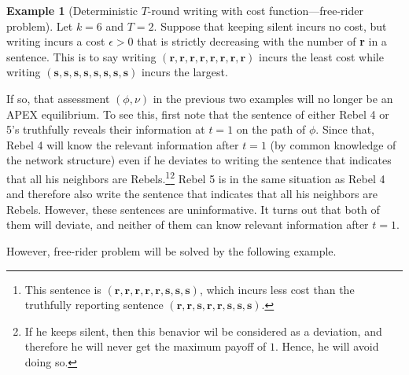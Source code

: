 \documentclass[12pt,letter]{article}
\theoremstyle{definition}
\newtheorem{example}{Example}
\theoremstyle{remark}
\theoremstyle{claim}
\begin{document}
\begin{example}[Deterministic $T$-round writing with cost function---free-rider problem]
\label{ex:cost_function_talk_fr}
Let $k=6$ and $T=2$. Suppose that keeping silent incurs no cost, but writing incurs a cost $\epsilon>0$ that is strictly decreasing with the number of \textbf{r} in a sentence. This is to say writing $(\textbf{r},\textbf{r},\textbf{r},\textbf{r},\textbf{r},\textbf{r},\textbf{r},\textbf{r})$ incurs the least cost while writing $(\textbf{s},\textbf{s},\textbf{s},\textbf{s},\textbf{s},\textbf{s},\textbf{s},\textbf{s})$ incurs the largest. 

If so, that assessment $(\phi, \nu)$ in the previous two examples will no longer be an APEX equilibrium. To see this, first note that the sentence of either Rebel 4 or 5's truthfully reveals their information at $t=1$ on the path of $\phi$. Since that, Rebel 4 will know the relevant information after $t=1$ (by common knowledge of the network structure) even if he deviates to writing the sentence that indicates that all his neighbors are Rebels.\footnote{This sentence is $(\textbf{r},\textbf{r},\textbf{r},\textbf{r},\textbf{r},\textbf{s},\textbf{s},\textbf{s})$, which incurs less cost than the truthfully reporting sentence $(\textbf{r},\textbf{r},\textbf{s},\textbf{r},\textbf{r},\textbf{s},\textbf{s},\textbf{s})$.}\footnote{If he keeps silent, then this benavior wil be considered as a deviation, and therefore he will never get the maximum payoff of $1$. Hence, he will avoid doing so.}
Rebel 5 is in the same situation as Rebel 4 and therefore also write the sentence that indicates that all his neighbors are Rebels. However, these sentences are uninformative. It turns out that both of them will deviate, and neither of them can know relevant information after $t=1$.

However, free-rider problem will be solved by the following example.
\end{example}
\end{document}

